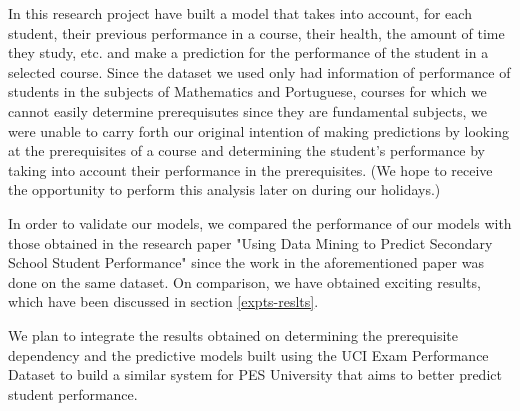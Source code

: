 \documentclass[conference]{IEEEtran}
\begin{document}
In this research project have built a model that takes into account, for each student, their previous performance in a course, their health, the amount of time they study, etc. and make a prediction for the performance of the student in a selected course. Since the dataset we used only had information of performance of students in the subjects of Mathematics and Portuguese, courses for which we cannot easily determine prerequisutes since they are fundamental subjects, we were unable to carry forth our original intention of making predictions by looking at the prerequisites of a course and determining the student's performance by taking into account their performance in the prerequisites. (We hope to receive the opportunity to perform this analysis later on during our holidays.)

In order to validate our models, we compared the performance of our models with those obtained in the research paper "Using Data Mining to Predict Secondary School Student Performance"\cite{ref:4} since the work in the aforementioned paper was done on the same dataset. On comparison, we have obtained exciting results, which have been discussed in section \ref{expts-reslts}.

We plan to integrate the results obtained on determining the prerequisite dependency and the predictive models built using the UCI Exam Performance Dataset \cite{Lichman:2013}\cite{ref:4} to build a similar system for PES University that aims to better predict student performance.

\end{document}
